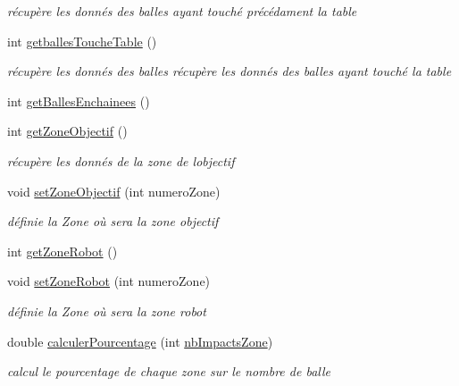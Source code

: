 \begin{DoxyCompactItemize}
\begin{DoxyCompactList}\small\item\em récupère les donnés des balles ayant touché précédament la table \end{DoxyCompactList}\item 
int \hyperlink{class_statistiques_seance_a1f956e08733a81d0a86673cae6bc7feb}{getballes\+Touche\+Table} ()
\begin{DoxyCompactList}\small\item\em récupère les donnés des balles récupère les donnés des balles ayant touché la table \end{DoxyCompactList}\item 
int \hyperlink{class_statistiques_seance_a1f241d7ef584ebffa2246134c63be53b}{get\+Balles\+Enchainees} ()
\item 
int \hyperlink{class_statistiques_seance_a61c01cb1d35cda871e8243658213ee5b}{get\+Zone\+Objectif} ()
\begin{DoxyCompactList}\small\item\em récupère les donnés de la zone de l\textquotesingle{}objectif \end{DoxyCompactList}\item 
void \hyperlink{class_statistiques_seance_af7c8281e195c0822463e6747bd0695ef}{set\+Zone\+Objectif} (int numero\+Zone)
\begin{DoxyCompactList}\small\item\em définie la Zone où sera la zone objectif \end{DoxyCompactList}\item 
int \hyperlink{class_statistiques_seance_ad1bdc22fbd9f37fab06d9fc24e9f1bc4}{get\+Zone\+Robot} ()
\item 
void \hyperlink{class_statistiques_seance_a97a0cf5b45add60d7a3e31207fe360a0}{set\+Zone\+Robot} (int numero\+Zone)
\begin{DoxyCompactList}\small\item\em définie la Zone où sera la zone robot \end{DoxyCompactList}\item 
double \hyperlink{class_statistiques_seance_a67759edd6c296bd6b66f7860dbac130e}{calculer\+Pourcentage} (int \hyperlink{class_statistiques_seance_aa4a040cda282d5b1c250025f8e191e20}{nb\+Impacts\+Zone})
\begin{DoxyCompactList}\small\item\em calcul le pourcentage de chaque zone sur le nombre de balle \end{DoxyCompactList}\item 

\end{DoxyCompactItemize}
